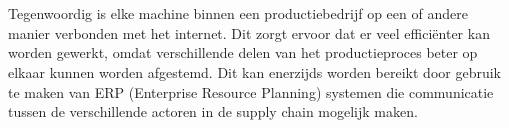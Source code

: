 
%
%
%
%
%

%



\chapter*{}

Tegenwoordig is elke machine binnen een productiebedrijf op een of andere manier verbonden met het internet. Dit zorgt ervoor dat er veel efficiënter kan worden gewerkt, omdat verschillende delen van het productieproces beter op elkaar kunnen worden afgestemd. Dit kan enerzijds worden bereikt door gebruik te maken van ERP (Enterprise Resource Planning) systemen die communicatie tussen de verschillende actoren in de supply chain mogelijk maken.

